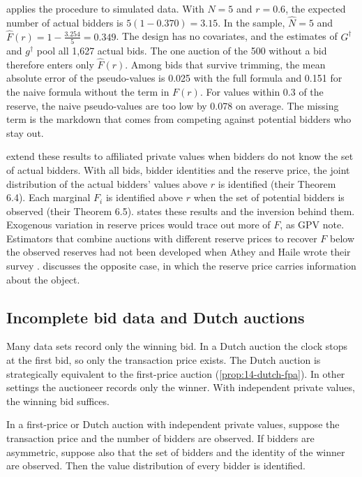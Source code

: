 applies the procedure to simulated data. With $N=5$ and $r=0.6$, the expected number of actual bidders is $5(1-0.370)=3.15$. In the sample, $\hat N=5$ and $\hat F(r)=1-\frac{3.254}{5}=0.349$. The design has no covariates, and the estimates of $G^\dagger$ and $g^\dagger$ pool all 1,627 actual bids. The one auction of the 500 without a bid therefore enters only $\hat F(r)$. Among bids that survive trimming, the mean absolute error of the pseudo-values is 0.025 with the full formula and 0.151 for the naive formula without the term in $F(r)$. For values within 0.3 of the reserve, the naive pseudo-values are too low by 0.078 on average. The missing term is the markdown that comes from competing against potential bidders who stay out.

  extend these results to affiliated private values when bidders do not know the set of actual bidders. With all bids, bidder identities and the reserve price, the joint distribution of the actual bidders' values above $r$ is identified (their Theorem 6.4). Each marginal $F_i$ is identified above $r$ when the set of potential bidders is observed (their Theorem 6.5).  states these results and the inversion behind them. Exogenous variation in reserve prices would trace out more of $F$, as GPV note. Estimators that combine auctions with different reserve prices to recover $F$ below the observed reserves had not been developed when Athey and Haile wrote their survey \citep[Section 6.3.1]{AtheyHaile2007}.  discusses the opposite case, in which the reserve price carries information about the object.

\subsection{Incomplete bid data and Dutch auctions}\label{sec:15-gpv-winbid}

Many data sets record only the winning bid. In a Dutch auction the clock stops at the first bid, so only the transaction price exists. The Dutch auction is strategically equivalent to the first-price auction (\cref{prop:14-dutch-fpa}). In other settings the auctioneer records only the winner. With independent private values, the winning bid suffices.

\begin{proposition}\label{prop:15-winbid}
In a first-price or Dutch auction with independent private values, suppose the transaction price and the number of bidders are observed. If bidders are asymmetric, suppose also that the set of bidders and the identity of the winner are observed. Then the value distribution of every bidder is identified.
\end{proposition}

